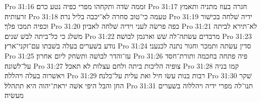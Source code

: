 Pro 31:16  זממה שׂדה ותקחהו מפרי כפיה נטע כרם׃
Pro 31:17  חגרה בעוז מתניה ותאמץ זרעותיה׃
Pro 31:18  טעמה כי־טוב סחרה לא־יכבה בליל נרה׃
Pro 31:19  ידיה שׁלחה בכישׁור וכפיה תמכו פלך׃
Pro 31:20  כפה פרשׂה לעני וידיה שׁלחה לאביון׃
Pro 31:21  לא־תירא לביתה משׁלג כי כל־ביתה לבשׁ שׁנים׃
Pro 31:22  מרבדים עשׂתה־לה שׁשׁ וארגמן לבושׁה׃
Pro 31:23  נודע בשׁערים בעלה בשׁבתו עם־זקני־ארץ׃
Pro 31:24  סדין עשׂתה ותמכר וחגור נתנה לכנעני׃
Pro 31:25  עז־והדר לבושׁה ותשׂחק ליום אחרון׃
Pro 31:26  פיה פתחה בחכמה ותורת־חסד על־לשׁונה׃
Pro 31:27  צופיה הליכות ביתה ולחם עצלות לא תאכל׃
Pro 31:28  קמו בניה ויאשׁרוה בעלה ויהללה׃
Pro 31:29  רבות בנות עשׂו חיל ואת עלית על־כלנה׃
Pro 31:30  שׁקר החן והבל היפי אשׁה יראת־יהוה היא תתהלל׃
Pro 31:31  תנו־לה מפרי ידיה ויהללוה בשׁערים מעשׂיה׃


